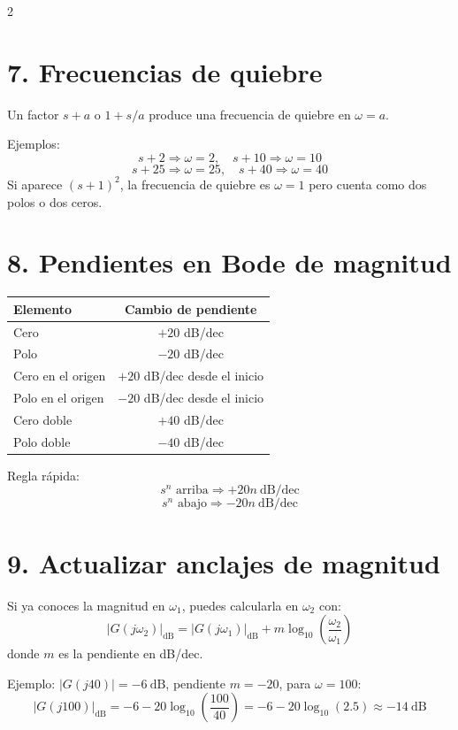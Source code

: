 \documentclass[11pt]{article}
\begin{document}
\begin{multicols}{2}
\section*{7. Frecuencias de quiebre}

Un factor $s+a$ o $1+s/a$ produce una frecuencia de quiebre en $\omega=a$.

Ejemplos:
\[
s+2 \Rightarrow \omega=2, \quad s+10 \Rightarrow \omega=10
\]
\[
s+25 \Rightarrow \omega=25, \quad s+40 \Rightarrow \omega=40
\]
Si aparece $(s+1)^2$, la frecuencia de quiebre es $\omega=1$ pero cuenta como dos polos o dos ceros.

\section*{8. Pendientes en Bode de magnitud}

\begin{center}
\begin{tabular}{lc}
\toprule
Elemento & Cambio de pendiente \\
\midrule
Cero & $+20$ dB/dec \\
Polo & $-20$ dB/dec \\
Cero en el origen & $+20$ dB/dec desde el inicio \\
Polo en el origen & $-20$ dB/dec desde el inicio \\
Cero doble & $+40$ dB/dec \\
Polo doble & $-40$ dB/dec \\
\bottomrule
\end{tabular}
\end{center}

Regla rápida:
\[
s^n \text{ arriba} \Rightarrow +20n\ \text{dB/dec}
\]
\[
s^n \text{ abajo} \Rightarrow -20n\ \text{dB/dec}
\]

\section*{9. Actualizar anclajes de magnitud}

Si ya conoces la magnitud en $\omega_1$, puedes calcularla en $\omega_2$ con:
\[
|G(j\omega_2)|_{\mathrm{dB}}=|G(j\omega_1)|_{\mathrm{dB}}+m\log_{10}\!\left(\frac{\omega_2}{\omega_1}\right)
\]
donde $m$ es la pendiente en dB/dec.

Ejemplo: $|G(j40)|=-6\ \text{dB}$, pendiente $m=-20$, para $\omega=100$:
\[
|G(j100)|_{\mathrm{dB}}=-6-20\log_{10}\!\left(\frac{100}{40}\right)=-6-20\log_{10}(2.5)\approx -14\ \text{dB}
\]


\end{multicols}
\end{document}
